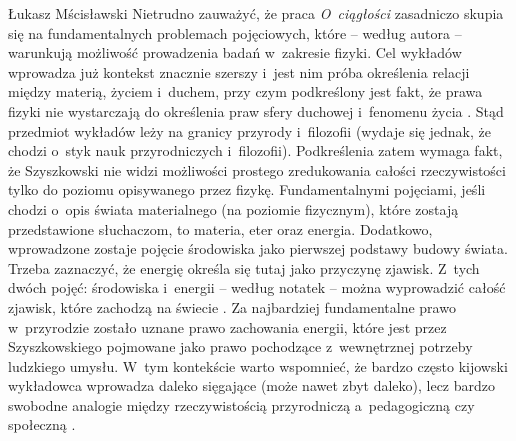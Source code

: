 \begin{artplenv}{Łukasz Mścisławski}
Nietrudno zauważyć, że praca \textit{O~ciągłości} zasadniczo skupia się na fundamentalnych problemach pojęciowych, które -- według autora -- warunkują możliwość prowadzenia badań w~zakresie fizyki. Cel wykładów wprowadza już kontekst znacznie szerszy i~jest nim próba określenia relacji między materią, życiem i~duchem, przy czym podkreślony jest fakt, że prawa fizyki nie wystarczają do określenia praw sfery duchowej i~fenomenu życia
\parencite*[][k. 211r]{noauthor_noty_1917}. %
 Stąd przedmiot wykładów leży na granicy przyrody i~filozofii (wydaje się jednak, że chodzi o~styk nauk przyrodniczych i~filozofii). Podkreślenia zatem wymaga fakt, że Szyszkowski nie widzi możliwości prostego zredukowania całości rzeczywistości tylko do poziomu opisywanego przez fizykę. Fundamentalnymi pojęciami, jeśli chodzi o~opis świata materialnego (na poziomie fizycznym), które zostają przedstawione słuchaczom, to materia, eter oraz energia. Dodatkowo, wprowadzone zostaje pojęcie środowiska jako pierwszej podstawy budowy świata. Trzeba zaznaczyć, że energię określa się tutaj jako przyczynę zjawisk. Z~tych dwóch pojęć: środowiska i~energii -- według notatek -- można wyprowadzić całość zjawisk, które zachodzą na świecie 
\parencite*[][k. 211v]{noauthor_noty_1917}. %
 Za najbardziej fundamentalne prawo w~przyrodzie zostało uznane prawo zachowania energii, które jest przez Szyszkowskiego pojmowane jako prawo pochodzące z~wewnętrznej potrzeby ludzkiego umysłu. W~tym kontekście warto wspomnieć, że bardzo często kijowski wykładowca wprowadza daleko sięgające (może nawet zbyt daleko), lecz bardzo swobodne analogie między rzeczywistością przyrodniczą a~pedagogiczną czy społeczną 
\parencite[por. ][k. 211v]{noauthor_noty_1917}.%



\end{artplenv}
